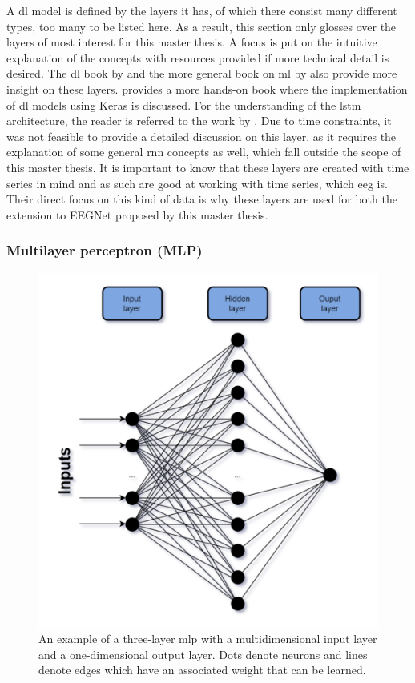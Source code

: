 A \gls{dl} model is defined by the layers it has, of which there consist many different types, too many to be listed here.
As a result, this section only glosses over the layers of most interest for this master thesis.
A focus is put on the intuitive explanation of the concepts with resources provided if more technical detail is desired.
The \gls{dl} book by \citet{dl_book} and the more general book on \gls{ml} by \citet{ml_book} also provide more insight on these layers.
 provides a more hands-on book where the implementation of \gls{dl} models using Keras is discussed.
For the understanding of the \gls{lstm} architecture, the reader is referred to the work by \citet{staudemeyer_understanding_2019}.
Due to time constraints, it was not feasible to provide a detailed discussion on this layer, as it requires the explanation of some general \gls{rnn} concepts as well, which fall outside the scope of this master thesis.
It is important to know that these layers are created with time series in mind and as such are good at working with time series, which \gls{eeg} is.
Their direct focus on this kind of data is why these layers are used for both the extension to EEGNet proposed by this master thesis.


\subsubsection{Multilayer perceptron (MLP)}
\label{subsubsec:processing_signals_ml_and_dl_dl_classifiers_mlp}

\begin{figure}[t]
    \centering
    \includegraphics[width=0.5\linewidth]{../images/pipeline/mlp.pdf}
    \captionsetup{width=0.8\linewidth}
    \captionsetup{justification=centering}
    \caption{An example of a three-layer \gls{mlp} with a multidimensional input layer and a one-dimensional output layer. Dots denote neurons and lines denote edges which have an associated weight that can be learned.}
    \label{fig:processing_signals_mlp}
\end{figure}

